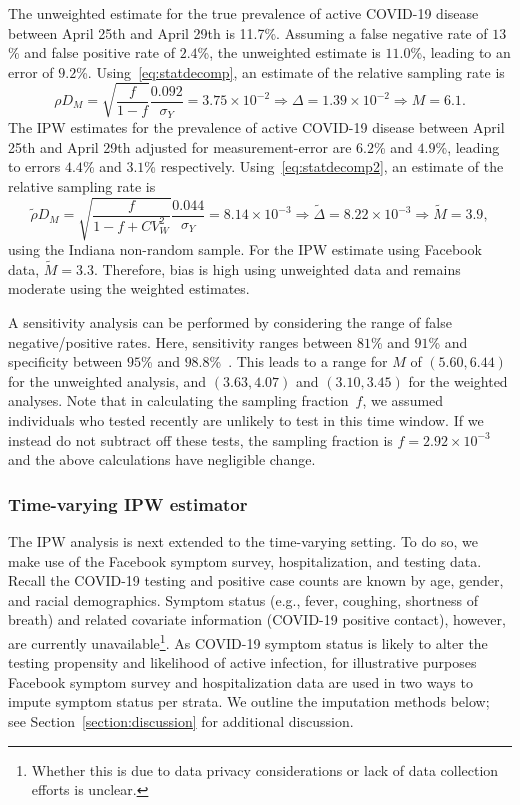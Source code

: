 \documentclass[11pt]{amsart}
\numberwithin{equation}{section}
\theoremstyle{plain}
\begin{document}
 The unweighted estimate for the true prevalence of active COVID-19 disease between April 25th and April 29th is 11.7\%.  Assuming a false negative rate of $13$\% and false positive rate of $2.4$\%, the unweighted estimate is $11.0$\%, leading to an error of $9.2$\%.  Using~\eqref{eq:statdecomp}, an estimate of the relative sampling rate is
 \begin{equation*}
 \rho D_M = \sqrt{\frac{f}{1-f}} \frac{\text{0.092}}{\sigma_Y} = 3.75 \times 10^{-2} \Rightarrow \Delta = 1.39 \times 10^{-2} \Rightarrow M = 6.1.
 \end{equation*}
 The IPW estimates for the prevalence of active COVID-19 disease between April 25th and April 29th adjusted for measurement-error are $6.2$\% and $4.9$\%, leading to errors $4.4$\% and $3.1$\% respectively.  Using~\eqref{eq:statdecomp2}, an estimate of the relative sampling rate is
 \begin{equation*}
 \tilde \rho D_M = \sqrt{\frac{f}{1-f+CV_W^2}} \frac{\text{0.044}}{\sigma_Y} = 8.14 \times 10^{-3} \Rightarrow \tilde \Delta = 8.22 \times 10^{-3}  \Rightarrow \tilde M = 3.9,
 \end{equation*}
 using the Indiana non-random sample.  For the IPW estimate using Facebook data, $\tilde M = 3.3$. Therefore, bias is high using unweighted data and remains moderate using the weighted estimates.

 A sensitivity analysis can be performed by considering the range of false negative/positive rates.  Here, sensitivity ranges between $81$\% and $91$\% and specificity between $95$\% and $98.8$\%~\cite{Katz2020}. This leads to a range for $M$ of $(5.60, 6.44)$ for the unweighted analysis, and $(3.63,4.07)$ and $(3.10, 3.45)$ for the weighted analyses.  Note that in calculating the sampling fraction~$f$, we assumed individuals who tested recently are unlikely to test in this time window. If we instead do not subtract off these tests, the sampling fraction is $f = 2.92 \times 10^{-3}$ and the above calculations have negligible change.

 \subsubsection{Time-varying IPW estimator}
 \label{section:tvipw}

 The IPW analysis is next extended to the time-varying setting.  To do so, we make use of the Facebook symptom survey, hospitalization, and testing data.  Recall the COVID-19 testing and positive case counts are known by age, gender, and racial demographics. Symptom status (e.g., fever, coughing, shortness of breath) and related covariate information (COVID-19 positive contact), however, are currently unavailable\footnote{Whether this is due to data privacy considerations or lack of data collection efforts is unclear.}.  As COVID-19 symptom status is likely to alter the testing propensity and likelihood of active infection, for illustrative purposes Facebook symptom survey and hospitalization data are used in two ways to impute symptom status per strata. We outline the imputation methods below; see Section~\ref{section:discussion} for additional discussion.
\end{document}
